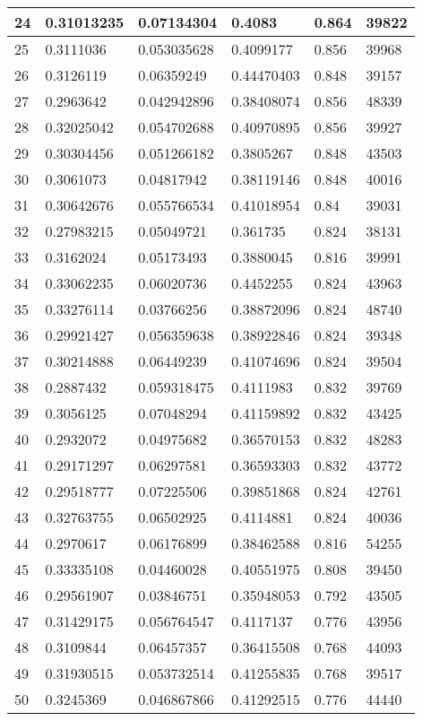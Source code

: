 \begin{longtable}{|l|l|l|l|l|l|}
24 & 0.31013235 & 0.07134304 & 0.4083 & 0.864 & 39822 \\ \hline 
25 & 0.3111036 & 0.053035628 & 0.4099177 & 0.856 & 39968 \\ \hline 
26 & 0.3126119 & 0.06359249 & 0.44470403 & 0.848 & 39157 \\ \hline 
27 & 0.2963642 & 0.042942896 & 0.38408074 & 0.856 & 48339 \\ \hline 
28 & 0.32025042 & 0.054702688 & 0.40970895 & 0.856 & 39927 \\ \hline 
29 & 0.30304456 & 0.051266182 & 0.3805267 & 0.848 & 43503 \\ \hline 
30 & 0.3061073 & 0.04817942 & 0.38119146 & 0.848 & 40016 \\ \hline 
31 & 0.30642676 & 0.055766534 & 0.41018954 & 0.84 & 39031 \\ \hline 
32 & 0.27983215 & 0.05049721 & 0.361735 & 0.824 & 38131 \\ \hline 
33 & 0.3162024 & 0.05173493 & 0.3880045 & 0.816 & 39991 \\ \hline 
34 & 0.33062235 & 0.06020736 & 0.4452255 & 0.824 & 43963 \\ \hline 
35 & 0.33276114 & 0.03766256 & 0.38872096 & 0.824 & 48740 \\ \hline 
36 & 0.29921427 & 0.056359638 & 0.38922846 & 0.824 & 39348 \\ \hline 
37 & 0.30214888 & 0.06449239 & 0.41074696 & 0.824 & 39504 \\ \hline 
38 & 0.2887432 & 0.059318475 & 0.4111983 & 0.832 & 39769 \\ \hline 
39 & 0.3056125 & 0.07048294 & 0.41159892 & 0.832 & 43425 \\ \hline 
40 & 0.2932072 & 0.04975682 & 0.36570153 & 0.832 & 48283 \\ \hline 
41 & 0.29171297 & 0.06297581 & 0.36593303 & 0.832 & 43772 \\ \hline 
42 & 0.29518777 & 0.07225506 & 0.39851868 & 0.824 & 42761 \\ \hline 
43 & 0.32763755 & 0.06502925 & 0.4114881 & 0.824 & 40036 \\ \hline 
44 & 0.2970617 & 0.06176899 & 0.38462588 & 0.816 & 54255 \\ \hline 
45 & 0.33335108 & 0.04460028 & 0.40551975 & 0.808 & 39450 \\ \hline 
46 & 0.29561907 & 0.03846751 & 0.35948053 & 0.792 & 43505 \\ \hline 
47 & 0.31429175 & 0.056764547 & 0.4117137 & 0.776 & 43956 \\ \hline 
48 & 0.3109844 & 0.06457357 & 0.36415508 & 0.768 & 44093 \\ \hline 
49 & 0.31930515 & 0.053732514 & 0.41255835 & 0.768 & 39517 \\ \hline 
50 & 0.3245369 & 0.046867866 & 0.41292515 & 0.776 & 44440 \\ \hline 
\end{longtable}